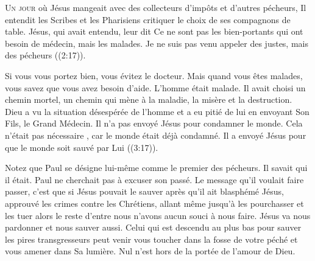 



\lettrine{U}{n jour} où Jésus mangeait avec des collecteurs d'impôts
 et d'autres pécheurs, Il entendit les Scribes et les Pharisiens
 critiquer le choix de ses compagnons de table.
 \Og Jésus, qui avait entendu, leur dit\frcolon
 Ce ne sont pas les bien-portants qui ont besoin de médecin,
 mais les malades. Je ne suis pas venu appeler des justes,
 mais des pécheurs \Fg{} 
 ((2:17)).


Si vous vous portez bien, vous évitez le docteur.
 Mais quand vous êtes malades, vous savez que vous avez besoin d'aide.
 L'homme était malade. Il avait choisi un chemin mortel,
 un chemin qui mène à la maladie, la misère et la destruction.
 Dieu a vu la situation désespérée de l'homme et a eu pitié de lui
 en envoyant Son Fils, le Grand Médecin.
 Il n'a pas envoyé Jésus pour condamner le monde.
 Cela n'était pas nécessaire ,
 car le monde était déjà condamné. Il a envoyé Jésus
 \Og pour que le monde soit sauvé par Lui \Fg{} 
 ((3:17)).

Notez que Paul se désigne lui-même comme le premier des pécheurs.
 Il savait qui il était. Paul ne cherchait pas à excuser son passé.
 Le message qu'il voulait faire passer, c'est que si Jésus pouvait le sauver
 \ocadr après qu'il ait blasphémé Jésus, approuvé les crimes
 contre les Chrétiens, allant même jusqu'à les pourchasser
 et les tuer \fcadr{} alors le reste d'entre nous n'avons aucun souci
 à nous faire. Jésus va nous pardonner et nous sauver aussi.
 Celui qui est descendu au plus bas pour sauver les pires transgresseurs
 peut venir vous toucher dans la fosse de votre péché
 et vous amener dans Sa lumière.
 Nul n'est hors de la portée de l'amour de Dieu.

\dvrule



